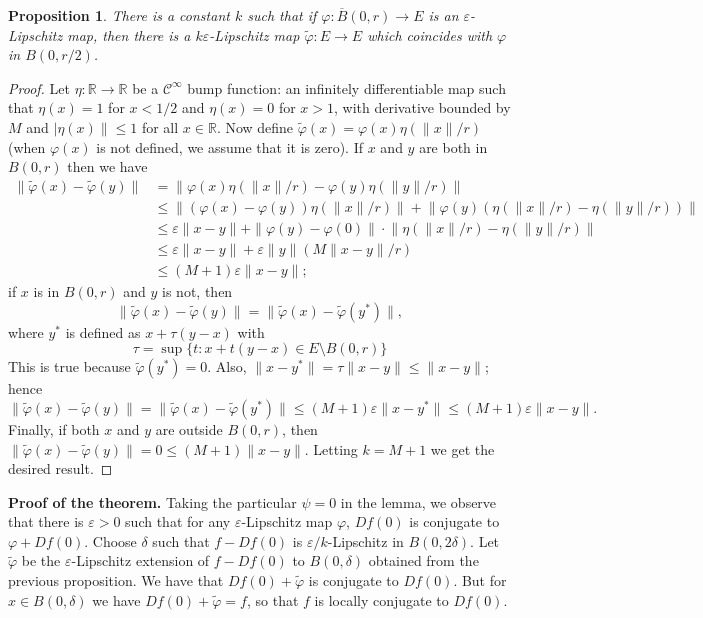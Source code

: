 \documentclass[12pt]{article}
\newcommand{\R}{\mathbb{R}}
\newtheorem{proposition}{Proposition}
\renewcommand{\phi}{\varphi}
\renewcommand{\epsilon}{\varepsilon}
\begin{document}
\begin{proposition} There is a constant $k$ such that if $\phi\colon \overline B(0,r)\to E$ is an $\epsilon$-Lipschitz map, then 
there is a $k\epsilon$-Lipschitz map $\tilde \phi\colon E\to E$
which coincides with $\phi$ in $B(0,r/2)$.
\end{proposition}
\begin{proof}
Let $\eta\colon \R \to \R$ be a $\mathcal{C}^\infty$ bump function: an infinitely
differentiable  map such that
$\eta(x) = 1$ for $x<1/2$ and $\eta(x) = 0$ for $x>1$, with derivative bounded by $M$ and $|\eta(x)\|\leq 1$ for all $x\in \R$.
Now define $\tilde \phi(x) = \phi(x)\eta(\|x\|/r)$ (when $\phi(x)$ is not
defined, we assume that it is zero).
If $x$ and $y$ are both in $B(0,r)$ then we have
\begin{align*}
\|\tilde\phi(x)-\tilde\phi(y)\| &= \big\|\phi(x)\eta(\|x\|/r) -
\phi(y)\eta(\|y\|/r)\big\| \\
&\leq \big\|(\phi(x)-\phi(y))\eta(\|x\|/r)\big\| +
\big\|\phi(y)(\eta(\|x\|/r)-\eta(\|y\|/r))\big\|\\
&\leq \epsilon\|x-y\| +
\|\phi(y)-\phi(0)\|\cdot\big\|\eta(\|x\|/r)-\eta(\|y\|/r)\big\|\\
&\leq \epsilon\|x-y\| + \epsilon\|y\|(M\|x-y\|/r)\\
&\leq (M+1)\epsilon\|x-y\|;
\end{align*}
if $x$ is in $B(0,r)$ and $y$ is not, then
$$\|\tilde\phi(x)-\tilde\phi(y)\| = \|\tilde\phi(x) - \tilde\phi(y^*)\|,$$
where $y^*$ is defined as $x+\tau(y-x)$ with
$$\tau = \sup\{t: x+t(y-x)\in E\setminus B(0,r)\}$$
This is true because $\tilde\phi(y^*)=0$. Also, $\|x-y^*\| = \tau\|x - y\|
\leq \|x-y\|$; hence
$$\|\tilde\phi(x)-\tilde\phi(y)\| = \|\tilde\phi(x) - \tilde\phi(y^*)\|\leq
(M+1)\epsilon\|x-y^*\| \leq (M+1)\epsilon\|x-y\|.$$
Finally, if both $x$ and $y$ are outside $B(0,r)$, then
$\|\tilde\phi(x)-\tilde\phi(y)\| = 0 \leq (M+1)\|x-y\|$. Letting $k=M+1$ we
get the desired result.
\end{proof}

\textbf{Proof of the theorem.}
Taking the particular $\psi = 0$ in the lemma, we observe that
there is $\epsilon>0$ such that for any $\epsilon$-Lipschitz map $\phi$,
$Df(0)$ is conjugate to $\phi + Df(0)$.
 Choose $\delta$ such that $f-Df(0)$ is $\epsilon/k$-Lipschitz in $B(0,2\delta)$.
Let $\tilde\phi$ be the $\epsilon$-Lipschitz extension of $f-Df(0)$ to
$B(0,\delta)$ obtained from the previous proposition. We have that
$Df(0)+\tilde\phi$ is conjugate to $Df(0)$. But for $x\in B(0,\delta)$ we have
$Df(0)+\tilde\phi = f$, so that $f$ is locally conjugate to $Df(0)$.
\end{document}
